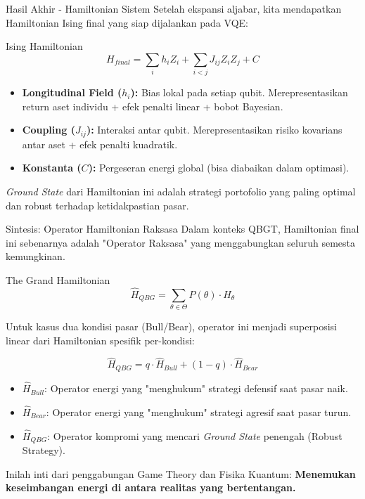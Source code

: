 \documentclass{beamer}
\begin{document}
\begin{frame}{Hasil Akhir - Hamiltonian Sistem}
    Setelah ekspansi aljabar, kita mendapatkan Hamiltonian Ising final yang siap dijalankan pada VQE:
    
    \begin{alertblock}{Ising Hamiltonian}
    $$ H_{final} = \sum_i h_i Z_i + \sum_{i<j} J_{ij} Z_i Z_j + C $$
    \end{alertblock}
    
    \begin{itemize}
        \item \textbf{Longitudinal Field ($h_i$):} Bias lokal pada setiap qubit. Merepresentasikan return aset individu + efek penalti linear + bobot Bayesian.
        \item \textbf{Coupling ($J_{ij}$):} Interaksi antar qubit. Merepresentasikan risiko kovarians antar aset + efek penalti kuadratik.
        \item \textbf{Konstanta ($C$):} Pergeseran energi global (bisa diabaikan dalam optimasi).
    \end{itemize}
    
    \textit{Ground State} dari Hamiltonian ini adalah strategi portofolio yang paling optimal dan robust terhadap ketidakpastian pasar.
\end{frame}

\begin{frame}{Sintesis: Operator Hamiltonian Raksasa}
    Dalam konteks QBGT, Hamiltonian final ini sebenarnya adalah "Operator Raksasa" yang menggabungkan seluruh semesta kemungkinan.
    
    \begin{block}{The Grand Hamiltonian}
    $$ \hat{H}_{QBG} = \sum_{\theta \in \Theta} P(\theta) \cdot \hat{H}_{\theta} $$
    \end{block}
    
    Untuk kasus dua kondisi pasar (Bull/Bear), operator ini menjadi superposisi linear dari Hamiltonian spesifik per-kondisi:
    
    $$ \hat{H}_{QBG} = q \cdot \hat{H}_{Bull} + (1-q) \cdot \hat{H}_{Bear} $$
    
    \begin{itemize}
        \item $\hat{H}_{Bull}$: Operator energi yang "menghukum" strategi defensif saat pasar naik.
        \item $\hat{H}_{Bear}$: Operator energi yang "menghukum" strategi agresif saat pasar turun.
        \item $\hat{H}_{QBG}$: Operator kompromi yang mencari \textit{Ground State} penengah (Robust Strategy).
    \end{itemize}
    
    Inilah inti dari penggabungan Game Theory dan Fisika Kuantum: \textbf{Menemukan keseimbangan energi di antara realitas yang bertentangan.}
\end{frame}
\end{document}
